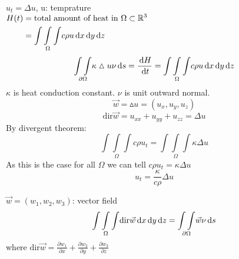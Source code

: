 \begin{example}
$u_t=\Delta u$, u: temprature\\
$\begin{aligned}H(t)&=\text{total amount of heat in } \Omega\subset\mathbb{R}^3\\
&=\underset{\Omega}{\int\int\int}c\rho u \,\mathrm{d} x\,\mathrm{d} y\,\mathrm{d} z
\end{aligned}$
\[\underset{\partial\Omega}{\int\int}\kappa\vartriangle u \nu\,\mathrm{d} s=\frac{\,\mathrm{d} H}{\,\mathrm{d} t}=\underset{\Omega}{\int\int\int}c\rho u \,\mathrm{d} x\,\mathrm{d} y\,\mathrm{d} z
\]
$\kappa$ is heat conduction constant. $\nu$ is unit outward normal.\\
\[\vec{w}=\vartriangle u=(u_x,u_y,u_z)
\]
\[\text{dir} \vec{w}=u_{xx}+u_{yy}+u_{zz}=\Delta u
\]
By divergent theorem:
\[\underset{\Omega}{\int\int\int}c\rho u_t=\underset{\Omega}{\int\int\int}\kappa\Delta u
\]
As this is the case for all $\Omega$ we can tell $c\rho u_t=\kappa\Delta u$
\[u_t=\frac{\kappa}{c\rho}{\Delta u}
\]
\end{example}
\begin{theorem}
$\vec{w}=(w_1,w_2,w_3)$: vector field\\
\[\underset{\Omega}{\int\int\int}\text{dir}\vec{w}\,\mathrm{d} x\,\mathrm{d} y\,\mathrm{d} z=\underset{\partial\Omega}{\int\int}\vec{w}\nu\,\mathrm{d} s
\]
where $\text{dir}\vec{w}=\frac{\partial w_1}{\partial x}+\frac{\partial w_2}{\partial y}+\frac{\partial w_3}{\partial z}$




\end{theorem}







